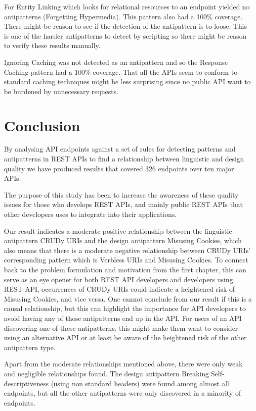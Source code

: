 \documentclass[a4paper,12pt]{article}
\begin{document}
For Entity Linking which looks for relational resources to an endpoint yielded no antipatterns (Forgetting Hypermedia). This pattern also had a 100\% coverage. There might be reason to see if the detection of the antipattern is to loose. This is one of the harder antipatterns to detect by scripting so there might be reason to verify these results manually. 

Ignoring Caching was not detected as an antipattern and so the Response Caching pattern had a 100\% coverage. That all the APIs seem to conform to standard caching techniques might be less surprising since no public API want to be burdened by unnecessary requests.  
\newpage
		
\section{Conclusion}

By analysing API endpoints against a set of rules for detecting patterns and antipatterns in REST APIs to find a relationship between linguistic and design quality we have produced results that covered 326 endpoints over ten major APIs. 

The purpose of this study has been to increase the awareness of these quality issues for those who develops REST APIs, and mainly public REST APIs that other developers uses to integrate into their applications. 

Our result indicates a moderate positive relationship between the linguistic antipattern CRUDy URIs and the design antipattern Misusing Cookies, which also means that there is a moderate negative relationship between CRUDy URIs' corresponding pattern which is Verbless URIs and Misusing Cookies. To connect back to the problem formulation and motivation from the first chapter, this can serve as an eye opener for both REST API developers and developers using REST API, occurrences of CRUDy URIs could indicate a heightened risk of Misusing Cookies, and vice versa. One cannot conclude from our result if this is a causal relationship, but this can highlight the importance for API developers to avoid having any of these antipatterns end up in the API. For users of an API discovering one of these antipatterns, this might make them want to consider using an alternative API or at least be aware of the heightened risk of the other antipattern type. 

Apart from the moderate relationships mentioned above, there were only weak and negligible relationships found. The design antipattern Breaking Self-descriptiveness (using non standard headers) were found among almost all endpoints, but all the other antipatterns were only discovered in a minority of endpoints. 
\end{document}
